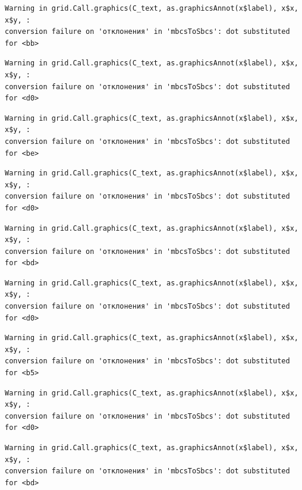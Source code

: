 \documentclass[
  letterpaper,
]{scrbook}
\theoremstyle{definition}
\theoremstyle{remark}
\begin{document}
\begin{verbatim}
Warning in grid.Call.graphics(C_text, as.graphicsAnnot(x$label), x$x, x$y, :
conversion failure on 'отклонения' in 'mbcsToSbcs': dot substituted for <bb>
\end{verbatim}

\begin{verbatim}
Warning in grid.Call.graphics(C_text, as.graphicsAnnot(x$label), x$x, x$y, :
conversion failure on 'отклонения' in 'mbcsToSbcs': dot substituted for <d0>
\end{verbatim}

\begin{verbatim}
Warning in grid.Call.graphics(C_text, as.graphicsAnnot(x$label), x$x, x$y, :
conversion failure on 'отклонения' in 'mbcsToSbcs': dot substituted for <be>
\end{verbatim}

\begin{verbatim}
Warning in grid.Call.graphics(C_text, as.graphicsAnnot(x$label), x$x, x$y, :
conversion failure on 'отклонения' in 'mbcsToSbcs': dot substituted for <d0>
\end{verbatim}

\begin{verbatim}
Warning in grid.Call.graphics(C_text, as.graphicsAnnot(x$label), x$x, x$y, :
conversion failure on 'отклонения' in 'mbcsToSbcs': dot substituted for <bd>
\end{verbatim}

\begin{verbatim}
Warning in grid.Call.graphics(C_text, as.graphicsAnnot(x$label), x$x, x$y, :
conversion failure on 'отклонения' in 'mbcsToSbcs': dot substituted for <d0>
\end{verbatim}

\begin{verbatim}
Warning in grid.Call.graphics(C_text, as.graphicsAnnot(x$label), x$x, x$y, :
conversion failure on 'отклонения' in 'mbcsToSbcs': dot substituted for <b5>
\end{verbatim}

\begin{verbatim}
Warning in grid.Call.graphics(C_text, as.graphicsAnnot(x$label), x$x, x$y, :
conversion failure on 'отклонения' in 'mbcsToSbcs': dot substituted for <d0>
\end{verbatim}

\begin{verbatim}
Warning in grid.Call.graphics(C_text, as.graphicsAnnot(x$label), x$x, x$y, :
conversion failure on 'отклонения' in 'mbcsToSbcs': dot substituted for <bd>
\end{verbatim}
\end{document}
